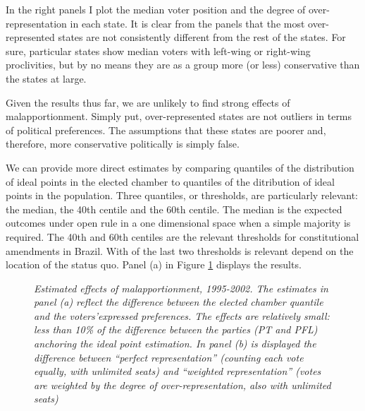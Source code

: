 In the right panels  I plot the median voter position and the degree of over-representation in each state. It is clear from the panels that the most over-represented states are not consistently different from the rest of the states. For sure, particular states show median voters with left-wing or right-wing proclivities, but by no means they are as a group more (or less) conservative than the states at large.  

Given the results thus far, we are unlikely to find strong effects of malapportionment. Simply put, over-represented states are not outliers in terms of political preferences. The assumptions that these states are poorer and, therefore, more conservative politically is simply false. 

We can provide more direct estimates by comparing quantiles of the distribution of ideal points in the elected chamber to quantiles of the ditribution of ideal points in the population. Three quantiles, or thresholds, are particularly relevant: the median, the 40th centile and the 60th centile. The median is the expected outcomes under  open rule in a one dimensional space when a simple majority is required. The 40th and 60th centiles are the relevant thresholds for constitutional amendments in Brazil. With of the last two thresholds is relevant depend on the location of the status quo. Panel (a) in Figure \ref{fig:thresholds} displays the results.


\begin{figure}
  \centering
  \centering
  \caption{\emph{Estimated effects of malapportionment, 1995-2002. The estimates in panel (a)  reflect the difference between the elected chamber quantile and the voters'expressed preferences. The  effects are relatively small: less than 10\% of the difference between the parties (PT and PFL) anchoring the ideal point estimation. In panel (b) is displayed the difference between ``perfect representation'' (counting each vote equally, with unlimited seats) and ``weighted representation'' (votes are weighted by the degree of over-representation, also with unlimited seats)}}
  \label{fig:thresholds}
\end{figure}
 

